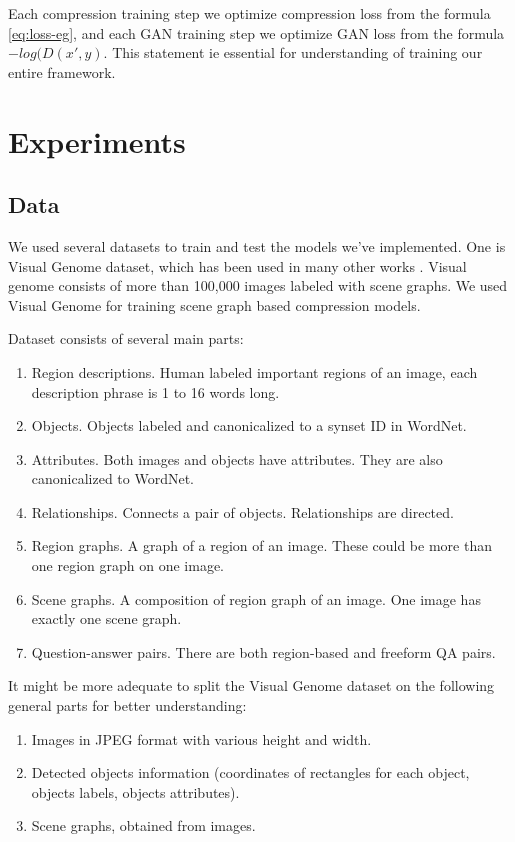 Each compression training step we optimize compression loss from the formula \ref{eq:loss-eg}, and each GAN training step we optimize GAN loss from the formula $-log(D(x',y)$. This  statement ie essential for understanding of training our entire framework.

\chapter{Experiments}
\label{chapter:experiments}

\section{Data}
\label{section:data}

We used several datasets to train and test the models we've implemented. One is Visual Genome dataset, which has been used in many other works \cite{krishna_visual_2017}. Visual genome consists of more than 100,000 images labeled with scene graphs. We used Visual Genome for training scene graph based compression models.

Dataset consists of several main parts:

\begin{enumerate}
    \item Region descriptions. Human labeled important regions of an image, each description phrase is 1 to 16 words long.
    \item Objects. Objects labeled and canonicalized to a synset ID in WordNet.
    \item Attributes. Both images and objects have attributes. They are also canonicalized to WordNet.
    \item Relationships. Connects a pair of objects. Relationships are directed.
    \item Region graphs. A graph of a region of an image. These could be more than one region graph on one image.
    \item Scene graphs. A composition of region graph of an image. One image has exactly one scene graph.
    \item Question-answer pairs. There are both region-based and freeform QA pairs.
\end{enumerate}

It might be more adequate to split the Visual Genome dataset on the following general parts for better understanding:

\begin{enumerate}
    \item Images in JPEG format with various height and width.
    \item Detected objects information (coordinates of rectangles for each object, objects labels, objects attributes).
    \item Scene graphs, obtained from images.
\end{enumerate}

